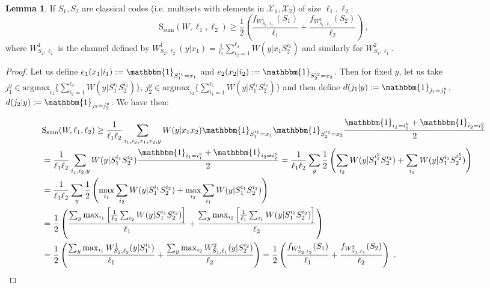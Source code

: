 \documentclass[11pt]{article}
\theoremstyle{definition}
\newtheorem{lem}[theo]{Lemma}
\theoremstyle{remark}
\begin{document}
\begin{lem}
  \label{lem:DoubleOneWay}
  If $S_1,S_2$ are classical codes (i.e. multisets with elements in $\mathcal{X}_1,\mathcal{X}_2$) of size $\ell_1,\ell_2$:
  \[ \mathrm{S}_{\text{sum}}(W,\ell_1,\ell_2) \geq \frac{1}{2}\left(\frac{f_{W^1_{S_2,\ell_2}}(S_1)}{\ell_1} + \frac{f_{W^2_{S_1,\ell_1}}(S_2)}{\ell_2}\right) \ ,\]
  where $W^1_{S_2, \ell_2}$ is the channel defined by $W^1_{S_2, \ell_2}(y|x_1) = \frac{1}{\ell_2} \sum_{i_2 = 1}^{\ell_2} W(y|x_1S_2^{i_2})$ and similarly for $W^2_{S_1, \ell_1}$.
\end{lem}
\begin{proof}
  Let us define $e_1(x_1|i_1) := \mathbbm{1}_{S_1^{i_1}=x_1}$ and $e_2(x_2|i_2) := \mathbbm{1}_{S_2^{i_2}=x_2}$. Then for fixed $y$, let us take $j_1^y \in \text{argmax}_{i_1} \{\sum_{i_2 = 1}^{\ell_2}W(y|S_1^{i_1}S_2^{i_2})\}$, $j_2^y \in \text{argmax}_{i_2}\{\sum_{i_1 = 1}^{\ell_1}W(y|S_1^{i_1}S_2^{i_2})\}$ and then define $d(j_1|y) := \mathbbm{1}_{j_1=j_1^y}$, $d(j_2|y) := \mathbbm{1}_{j_2=j_2^y}$. We have then:

  \begin{equation}
    \begin{aligned}
      &\mathrm{S}_{\text{sum}}(W,\ell_1,\ell_2) \geq \frac{1}{\ell_1\ell_2}\sum_{i_1,i_2,x_1,x_2,y}W(y|x_1x_2)\mathbbm{1}_{S_1^{i_1}=x_1}\mathbbm{1}_{S_2^{i_2}=x_2}\frac{\mathbbm{1}_{i_1=i_1^y}+\mathbbm{1}_{i_2=i_2^y}}{2}\\
      &= \frac{1}{\ell_1\ell_2}\sum_{i_1,i_2,y}W(y|S_1^{i_1}S_2^{i_2})\frac{\mathbbm{1}_{i_1=i_1^y}+\mathbbm{1}_{i_2=i_2^y}}{2}
      = \frac{1}{\ell_1\ell_2}\sum_{y}\frac{1}{2}\left(\sum_{i_2}W(y|S_1^{i_1^y}S_2^{i_2}) + \sum_{i_1}W(y|S_1^{i_1}S_2^{i_2^y})\right)\\
      &= \frac{1}{\ell_1\ell_2}\sum_{y}\frac{1}{2}\left(\max_{i_1}\sum_{i_2}W(y|S_1^{i_1}S_2^{i_2}) + \max_{i_2}\sum_{i_1}W(y|S_1^{i_1}S_2^{i_2})\right)\\
      &= \frac{1}{2}\left(\frac{\sum_{y}\max_{i_1}\left[\frac{1}{\ell_2}\sum_{i_2} W(y|S_1^{i_1}S_2^{i_2})\right]}{\ell_1} + \frac{\sum_{y}\max_{i_2}\left[\frac{1}{\ell_1}\sum_{i_1} W(y|S_1^{i_1}S_2^{i_2})\right]}{\ell_2} \right)\\
      &= \frac{1}{2}\left(\frac{\sum_{y}\max_{i_1}W^1_{S_2,\ell_2}(y|S_1^{i_1})}{\ell_1} + \frac{\sum_{y}\max_{i_2}W^2_{S_1,\ell_1}(y|S_2^{i_2})}{\ell_2} \right)
      = \frac{1}{2}\left(\frac{f_{W^1_{S_2,\ell_2}}(S_1)}{\ell_1} + \frac{f_{W^2_{S_1,\ell_1}}(S_2)}{\ell_2}\right) \ .
    \end{aligned}
  \end{equation}
\end{proof}
\end{document}
